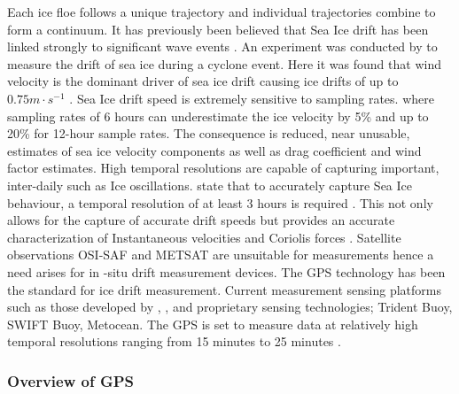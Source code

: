 Each ice floe follows a unique trajectory \cite{lepparanta2001sea}  and individual trajectories combine to form a continuum. It has previously been believed that Sea Ice drift has been linked strongly to significant wave events \cite{alberello2019drift}. An experiment was conducted by \textcite{alberello2019drift} to measure the drift of sea ice during a cyclone event. Here it was found that wind velocity is the dominant driver of sea ice drift \cite{alberello2019drift} causing ice drifts of up to $0.75 m\cdot s^{-1}$ \cite{alberello2019drift}. Sea Ice drift speed is extremely sensitive to sampling rates. \cite{alberello2019drift} where sampling rates of 6 hours can underestimate the ice velocity by 5\% \cite{alberello2019drift} and up to 20\% for 12-hour sample rates. The consequence is reduced, near unusable, estimates of sea ice velocity components as well as drag coefficient and wind factor estimates. High temporal resolutions are capable of capturing important, inter-daily such as Ice oscillations. \textcite{alberello2019drift} state that to accurately capture Sea Ice behaviour, a temporal resolution of at least 3 hours is required \cite{alberello2019drift}. This not only allows for the capture of accurate drift speeds but provides an accurate characterization of Instantaneous velocities and Coriolis forces \cite{alberello2019drift}. Satellite observations OSI-SAF and METSAT are unsuitable for measurements hence a need arises for in -situ drift measurement devices. The GPS technology has been the standard for ice drift measurement. Current measurement sensing platforms such as those developed by \textcite{kohout2015device}, \textcite{rabault2019open}, \textcite{doble2017robust} and proprietary sensing technologies; Trident Buoy, SWIFT Buoy, Metocean. The GPS is set to measure data at relatively high temporal resolutions ranging from 15 minutes \cite{alberello2019drift} to 25 minutes \cite{rabault2019open}.

\subsubsection{Overview of GPS}

